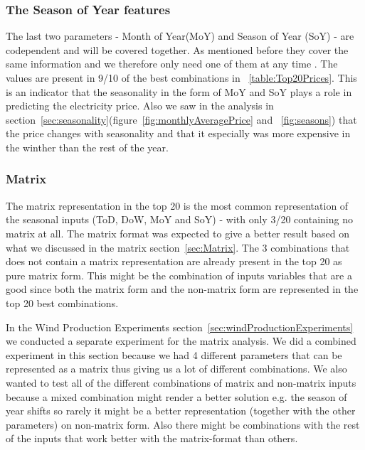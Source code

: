 \subsubsection{The Season of Year features}
The last two parameters - Month of Year(MoY) and Season of Year (SoY) - are codependent and will be covered together. As mentioned before they cover the same information and we therefore only need one of them at any time . The values are present in 9/10 of the best combinations in ~\ref{table:Top20Prices}. This is an indicator that the seasonality in the form of MoY and SoY plays a role in predicting the electricity price. Also we saw in the analysis in section~\ref{sec:seasonality}(figure~\ref{fig:monthlyAveragePrice} and ~\ref{fig:seasons}) that the price changes with seasonality and that it especially was more expensive in the winther than the rest of the year.

\subsubsection{Matrix}
The matrix representation in the top 20 is the most common representation of the seasonal inputs (ToD, DoW, MoY and SoY) - with only 3/20 containing no matrix at all. The matrix format was expected to give a better result based on what we discussed in the matrix section~\ref{sec:Matrix}. The 3 combinations that does not contain a matrix representation are already present in the top 20 as pure matrix form. This might be the combination of inputs variables that are a good since both the matrix form and the non-matrix form are represented in the top 20 best combinations.

In the Wind Production Experiments section~\ref{sec:windProductionExperiments} we conducted a separate experiment for the matrix analysis. We did a combined experiment in this section because we had 4 different parameters that can be represented as a matrix thus giving us a lot of different combinations. We also wanted to test all of the different combinations of matrix and non-matrix inputs because a mixed combination might render a better solution e.g. the season of year shifts so rarely it might be a better representation (together with the other parameters) on non-matrix form. Also there might be combinations with the rest of the inputs that work better with the matrix-format than others.


